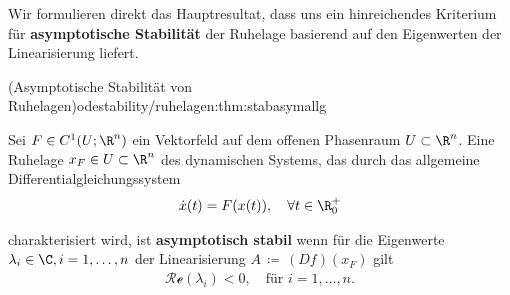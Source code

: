 \documentclass[letterpaper,10pt,english]{jupyterBook}
\begin{document}
\par
Wir formulieren direkt das Hauptresultat, dass uns ein hinreichendes Kriterium für \textbf{asymptotische Stabilität} der Ruhelage basierend auf den Eigenwerten der Linearisierung liefert.
\begin{theorem}{(Asymptotische Stabilität von Ruhelagen)}{odestability/ruhelagen:thm:stabasymallg}



\par
Sei \(F \in C^1(U; \R^n)\) ein Vektorfeld auf dem offenen Phasenraum \(U \subset \R^n\).
Eine Ruhelage \(x_F \in  U \subset \R^n\) des dynamischen Systems, das durch das allgemeine Differentialgleichungssystem
\begin{align*}
\dot{x}(t) = F(x(t)), \quad \forall t \in \R^+_0
\end{align*}
\par
charakterisiert wird, ist \textbf{asymptotisch stabil} wenn für die Eigenwerte \(\lambda_i \in \C, i=1,\ldots,n\) der Linearisierung \(A \, \coloneqq \, (Df)(x_F)\) gilt
\begin{align*}
\mathcal{Re}(\lambda_i)<0, \quad \text{für } i=1,\ldots,n.
\end{align*}\end{theorem}
\end{document}

